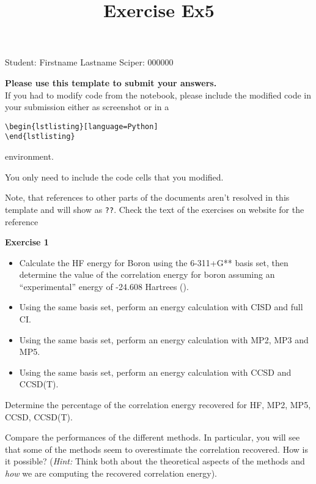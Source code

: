 \documentclass{article}
\title{Exercise Ex5}
\begin{document}
\maketitle\maketitle

Student:  Firstname Lastname    Sciper: 000000

\begin{mdframed}
\textbf{Please use this template to submit your answers.}\\
If you had to modify code from the notebook, please include the modified code in your submission either as screenshot or in a

\begin{verbatim}
\begin{lstlisting}[language=Python]
\end{lstlisting}
\end{verbatim}

environment.

You only need to include the code cells that you modified.

Note, that references to other parts of the documents aren't resolved in this template and will show as \texttt{??}. Check the text of the exercises on website for the reference
\end{mdframed}

\begin{mdframed}
\textbf{Exercise 1}\\
\begin{itemize}
\item Calculate the HF energy for Boron using the 6-311+G** basis set, then determine the value of the correlation energy for boron assuming an ``experimental'' energy of -24.608 Hartrees (\cite{Schaefer_1968}).
\item Using the same basis set, perform an energy calculation with CISD and full CI.
\item Using the same basis set, perform an energy calculation with MP2, MP3 and MP5.
\item Using the same basis set, perform an energy calculation with CCSD and CCSD(T).
\end{itemize}

Determine the percentage of the correlation energy recovered for HF, MP2, MP5, CCSD, CCSD(T).

Compare the performances of the different methods. In particular, you will see that some of the methods seem to overestimate the correlation recovered. How is it possible? (\textit{Hint:} Think both about the theoretical aspects of the methods and \textit{how} we are computing the recovered correlation energy).
\end{mdframed}
\end{document}
